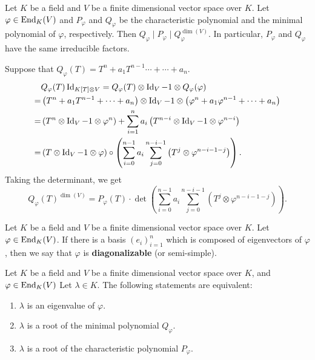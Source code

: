 \begin{propositionenv}
    Let $K$ be a field and $V$ be a finite dimensional vector space over $K$.
    Let $\varphi \in \operatorname{\mathrm{End}}_{K}(V)$ and $P_{\varphi}$ and $Q_{\varphi}$ be the characteristic polynomial and the minimal polynomial of $\varphi$, respectively.
    Then $Q_{\varphi} \mid P_{\varphi} \mid Q_{\varphi}^{\dim(V)}$.
    In particular, $P_{\varphi}$ and $Q_{\varphi}$ have the same irreducible factors.
\end{propositionenv}
\begin{proofenv}
    Suppose that $Q_{\varphi}(T) = T^n + a_1 T^{n-1} \cdots + \cdots + a_n$.
    $$\begin{aligned}
        & Q_{\varphi}(T) \operatorname{\mathrm{Id}}_{K[T]\otimes V} = Q_{\varphi}(T) \otimes \operatorname{\mathrm{Id}}_{V} - 1 \otimes Q_{\varphi}(\varphi)\\
        = & \left(T^n + a_1 T^{n-1} + \cdots + a_n\right) \otimes \operatorname{\mathrm{Id}}_{V} - 1 \otimes \left(\varphi^n + a_1 \varphi^{n-1} + \cdots + a_n\right)\\
        = & \left(T^n \otimes \operatorname{\mathrm{Id}}_{V} - 1 \otimes \varphi^n\right) + \sum_{i=1}^{n}a_i \left(T^{n-i}\otimes\operatorname{\mathrm{Id}}_{V} - 1 \otimes \varphi^{n-i}\right)\\
        = & \left(T \otimes \operatorname{\mathrm{Id}}_{V} - 1 \otimes \varphi\right) \circ \left(\sum_{i=0}^{n-1}a_i \sum_{j=0}^{n-i-1}\left(T^j \otimes \varphi^{n-i-1-j}\right)\right).
    \end{aligned}$$
    Taking the determinant, we get
    $$Q_{\varphi}(T)^{\dim(V)} = P_\varphi(T) \cdot \det\left(\sum_{i=0}^{n-1}a_i \sum_{j=0}^{n-i-1}\left(T^j \otimes \varphi^{n-i-1-j}\right)\right).$$
\end{proofenv}

\begin{definitionenv}
    Let $K$ be a field and $V$ be a finite dimensional vector space over $K$.
    Let $\varphi \in \operatorname{\mathrm{End}}_{K}(V)$.
    If there is a basis $(e_i)_{i=1}^n$ which is composed of eigenvectors of $\varphi$, then we say that $\varphi$ is
    \textbf{diagonalizable} (or semi-simple).
\end{definitionenv}

\begin{propositionenv}
    Let $K$ be a field and $V$ be a finite dimensional vector space over $K$,
    and $\varphi \in \operatorname{\mathrm{End}}_{K}(V)$
    Let $\lambda \in K$.
    The following statements are equivalent:
    \begin{enumerate}[label = (\arabic*)]
        \item $\lambda$ is an eigenvalue of $\varphi$.
        \item $\lambda$ is a root of the minimal polynomial $Q_{\varphi}$.
        \item $\lambda$ is a root of the characteristic polynomial $P_{\varphi}$.
    \end{enumerate}
\end{propositionenv}

